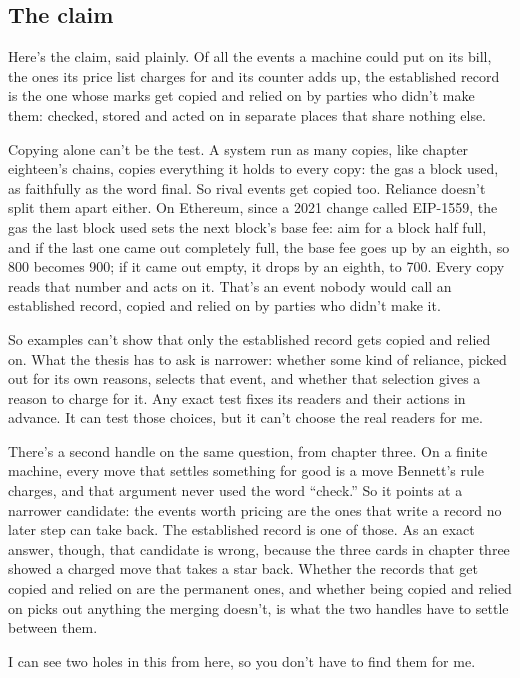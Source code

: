 \documentclass[11pt,twoside]{article}
\theoremstyle{thielethm}
\theoremstyle{thieledef}
\theoremstyle{thieledef}
\theoremstyle{thieledef}
\theoremstyle{thielethm}
\theoremstyle{thieleobs}
\theoremstyle{thielethm}
\begin{document}
\subsection{The claim}

Here's the claim, said plainly. Of all the events a machine could put on its bill, the ones its price list charges for and its counter adds up, the established record is the one whose marks get copied and relied on by parties who didn't make them: checked, stored and acted on in separate places that share nothing else.

Copying alone can't be the test. A system run as many copies, like chapter eighteen's chains, copies everything it holds to every copy: the gas a block used, as faithfully as the word final. So rival events get copied too. Reliance doesn't split them apart either. On Ethereum, since a 2021 change called EIP-1559, the gas the last block used sets the next block's base fee: aim for a block half full, and if the last one came out completely full, the base fee goes up by an eighth, so 800 becomes 900; if it came out empty, it drops by an eighth, to 700. Every copy reads that number and acts on it. That's an event nobody would call an established record, copied and relied on by parties who didn't make it.

So examples can't show that only the established record gets copied and relied on. What the thesis has to ask is narrower: whether some kind of reliance, picked out for its own reasons, selects that event, and whether that selection gives a reason to charge for it. Any exact test fixes its readers and their actions in advance. It can test those choices, but it can't choose the real readers for me.

There's a second handle on the same question, from chapter three. On a finite machine, every move that settles something for good is a move Bennett's rule charges, and that argument never used the word ``check.'' So it points at a narrower candidate: the events worth pricing are the ones that write a record no later step can take back. The established record is one of those. As an exact answer, though, that candidate is wrong, because the three cards in chapter three showed a charged move that takes a star back. Whether the records that get copied and relied on are the permanent ones, and whether being copied and relied on picks out anything the merging doesn't, is what the two handles have to settle between them.

I can see two holes in this from here, so you don't have to find them for me.
\end{document}
